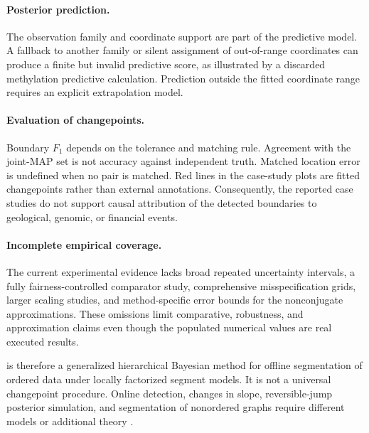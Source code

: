 \paragraph{Posterior prediction.}
The observation family and coordinate support are part of the predictive model. A fallback to another family or silent assignment of out-of-range coordinates can produce a finite but invalid predictive score, as illustrated by a discarded methylation predictive calculation. Prediction outside the fitted coordinate range requires an explicit extrapolation model.

\paragraph{Evaluation of changepoints.}
Boundary $F_1$ depends on the tolerance and matching rule. Agreement with the \BayesBreak joint-MAP set is not accuracy against independent truth. Matched location error is undefined when no pair is matched. Red lines in the case-study plots are fitted changepoints rather than external annotations. Consequently, the reported case studies do not support causal attribution of the detected boundaries to geological, genomic, or financial events.

\paragraph{Incomplete empirical coverage.}
The current experimental evidence lacks broad repeated uncertainty intervals, a fully fairness-controlled comparator study, comprehensive misspecification grids, larger scaling studies, and method-specific error bounds for the nonconjugate approximations. These omissions limit comparative, robustness, and approximation claims even though the populated numerical values are real executed results.



\BayesBreak is therefore a generalized hierarchical Bayesian method for offline segmentation of ordered data under locally factorized segment models. It is not a universal changepoint procedure. Online detection, changes in slope, reversible-jump posterior simulation, and segmentation of nonordered graphs require different models or additional theory \citep{adamsmackay2007bocpd,ruggieri2014bcpvs,green1995rjMCMC,fearnhead2006exact}.
